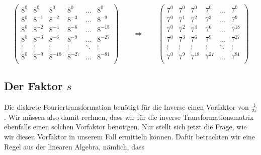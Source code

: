 \[
\begin{pmatrix}
	8^0 & 8^0 & 8^0 & 8^0 & \dots & 8^0 \\
	8^0 & 8^{-1} & 8^{-2} & 8^{-3} & \dots & 8^{-9} \\
	8^0 & 8^{-2} & 8^{-4} & 8^{-6} & \dots & 8^{-18} \\
	8^0 & 8^{-3} & 8^{-6} & 8^{-9} & \dots & 8^{-27} \\
 	\vdots & \vdots & \vdots & \vdots & \ddots & \vdots \\
	8^0 & 8^{-9} & 8^{-18} & 8^{-27} & \dots & 8^{-81} \\
\end{pmatrix}
\qquad
\Rightarrow
\qquad
\begin{pmatrix}
	7^0 & 7^0 & 7^0 & 7^0 & \dots & 7^0 \\
	7^0 & 7^{1} & 7^{2} & 7^{3} & \dots & 7^{9} \\
	7^0 & 7^{2} & 7^{4} & 7^{6} & \dots & 7^{18} \\
	7^0 & 7^{3} & 7^{6} & 7^{9} & \dots & 7^{27} \\
	\vdots & \vdots & \vdots & \vdots & \ddots & \vdots \\
	7^0 & 7^{9} & 7^{18} & 7^{27} & \dots & 7^{81} \\
\end{pmatrix}
\] 

\subsection{Der Faktor $s$
	\label{reedsolomon:subsection:sfaktor}}
Die diskrete Fouriertransformation benötigt für die Inverse einen Vorfaktor von $\frac{1}{2\pi}$.
Wir müssen also damit rechnen, dass wir für die inverse Transformationsmatrix ebenfalls einen solchen Vorfaktor benötigen.
Nur stellt sich jetzt die Frage, wie wir diesen Vorfaktor in unserem Fall ermitteln können.
Dafür betrachten wir eine Regel aus der linearen Algebra, nämlich, dass


